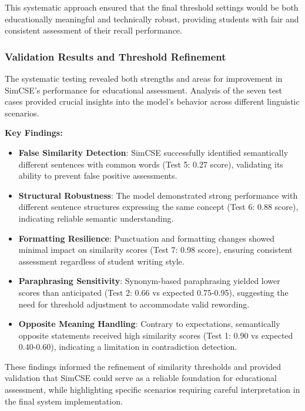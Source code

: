 {This systematic approach ensured that the final threshold settings would be both educationally meaningful and technically robust, providing students with fair and consistent assessment of their recall performance.

\subsubsection{Validation Results and Threshold Refinement}

The systematic testing revealed both strengths and areas for improvement in SimCSE's performance for educational assessment. Analysis of the seven test cases provided crucial insights into the model's behavior across different linguistic scenarios.

\textbf{Key Findings:}
\begin{itemize}
    \item \textbf{False Similarity Detection}: SimCSE successfully identified semantically different sentences with common words (Test 5: 0.27 score), validating its ability to prevent false positive assessments.
    
    \item \textbf{Structural Robustness}: The model demonstrated strong performance with different sentence structures expressing the same concept (Test 6: 0.88 score), indicating reliable semantic understanding.
    
    \item \textbf{Formatting Resilience}: Punctuation and formatting changes showed minimal impact on similarity scores (Test 7: 0.98 score), ensuring consistent assessment regardless of student writing style.
    
    \item \textbf{Paraphrasing Sensitivity}: Synonym-based paraphrasing yielded lower scores than anticipated (Test 2: 0.66 vs expected 0.75-0.95), suggesting the need for threshold adjustment to accommodate valid rewording.
    
    \item \textbf{Opposite Meaning Handling}: Contrary to expectations, semantically opposite statements received high similarity scores (Test 1: 0.90 vs expected 0.40-0.60), indicating a limitation in contradiction detection.
\end{itemize}

These findings informed the refinement of similarity thresholds and provided validation that SimCSE could serve as a reliable foundation for educational assessment, while highlighting specific scenarios requiring careful interpretation in the final system implementation.

}
